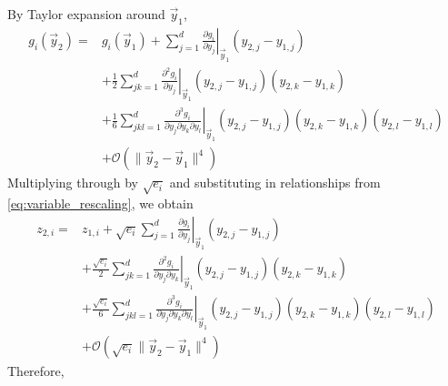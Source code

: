 \documentclass[12pt]{article}
\begin{document}
By Taylor expansion around $\vec{y}_1$,
%
\begin{equation}
\begin{aligned}
g_i(\vec{y}_2) =& 
g_i(\vec{y}_1) + \sum_{j=1}^d \left. \frac{\partial g_i}{\partial y_j} \right|_{\vec{y}_1} (y_{2,j}-y_{1,j})\\
&+ \frac{1}{2} \sum_{jk=1}^d \left. \frac{\partial^2 g_i}{\partial y_j} \right|_{\vec{y}_1} (y_{2,j}-y_{1,j}) (y_{2,k}-y_{1,k})\\
&+ \frac{1}{6} \sum_{jkl=1}^d \left. \frac{\partial^3 g_i}{\partial y_j \partial y_k \partial y_l} \right|_{\vec{y}_1} (y_{2,j}-y_{1,j}) (y_{2,k}-y_{1,k}) (y_{2,l}-y_{1,l}) \\
&+ \mathcal{O}( \|\vec{y}_2 - \vec{y}_1 \|^4)
\end{aligned}
\end{equation}
%
Multiplying through by $\sqrt{e_i}$ and
substituting in relationships from \eqref{eq:variable_rescaling}, we obtain
%
\begin{equation}
\begin{aligned}
z_{2,i} =& 
z_{1,i} + \sqrt{e_i} \sum_{j=1}^d \left. \frac{\partial g_i}{\partial y_j} \right|_{\vec{y}_1} (y_{2,j}-y_{1,j})\\
&+ \frac{\sqrt{e_i}}{2} \sum_{jk=1}^d \left. \frac{\partial^2 g_i}{\partial y_j \partial y_k} \right|_{\vec{y}_1} (y_{2,j}-y_{1,j}) (y_{2,k}-y_{1,k})\\
&+ \frac{\sqrt{e_i}}{6} \sum_{jkl=1}^d \left. \frac{\partial^3 g_i}{\partial y_j \partial y_k \partial y_l} \right|_{\vec{y}_1} (y_{2,j}-y_{1,j}) (y_{2,k}-y_{1,k}) (y_{2,l}-y_{1,l}) \\
&+ \mathcal{O}( \sqrt{e_i} \|\vec{y}_2 - \vec{y}_1 \|^4)
\end{aligned}
\end{equation}
%
Therefore, 
%
\end{document}
